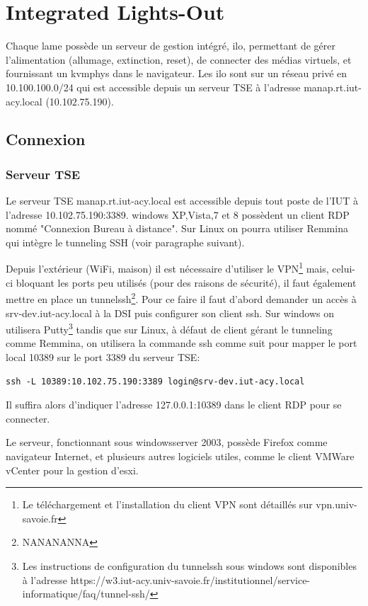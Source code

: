 \documentclass[a4paper,oneside]{report}
\begin{document}
\section{Integrated Lights-Out}
Chaque lame possède un serveur de gestion intégré, \gls{ilo}, permettant de gérer l'alimentation (allumage, extinction, reset), de connecter des médias virtuels, et fournissant un \gls{kvmphys} dans le navigateur.
Les \gls{ilo} sont sur un réseau privé en 10.100.100.0/24 qui est accessible depuis un serveur TSE à l'adresse manap.rt.iut-acy.local (10.102.75.190).

\subsection{Connexion}
\subsubsection{Serveur TSE}
Le serveur TSE manap.rt.iut-acy.local est accessible depuis tout poste de l'IUT à l'adresse 10.102.75.190:3389. \gls{windows} XP,Vista,7 et 8 possèdent un client RDP nommé "Connexion Bureau à distance". Sur Linux on pourra utiliser Remmina qui intègre le tunneling SSH (voir paragraphe suivant).


Depuis l'extérieur (WiFi, maison) il est nécessaire d'utiliser le VPN\footnote{Le téléchargement et l'installation du client VPN sont détaillés sur vpn.univ-savoie.fr} mais, celui-ci bloquant les ports peu utilisés (pour des raisons de sécurité), il faut également mettre en place un \gls{tunnelssh}\footnote{NANANANNA}.
Pour ce faire il faut d'abord demander un accès à srv-dev.iut-acy.local à la DSI puis configurer son client \gls{ssh}.\newline
Sur \gls{windows} on utilisera Putty\footnote{Les instructions de configuration du \gls{tunnelssh} sous \gls{windows} sont disponibles à l'adresse https://w3.iut-acy.univ-savoie.fr/institutionnel/service-informatique/faq/tunnel-ssh/} tandis que sur Linux, à défaut de client gérant le tunneling comme Remmina, on utilisera la commande ssh comme suit pour mapper le port local 10389 sur le port 3389 du serveur TSE:
\label{tunnelingSsh}
\begin{verbatim}
ssh -L 10389:10.102.75.190:3389 login@srv-dev.iut-acy.local
\end{verbatim}
Il suffira alors d'indiquer l'adresse 127.0.0.1:10389 dans le client RDP pour se connecter.

Le serveur, fonctionnant sous \gls{windowsserver} 2003, possède Firefox comme navigateur Internet, et plusieurs autres logiciels utiles, comme le client VMWare vCenter pour la gestion d'\gls{esxi}.
\end{document}
